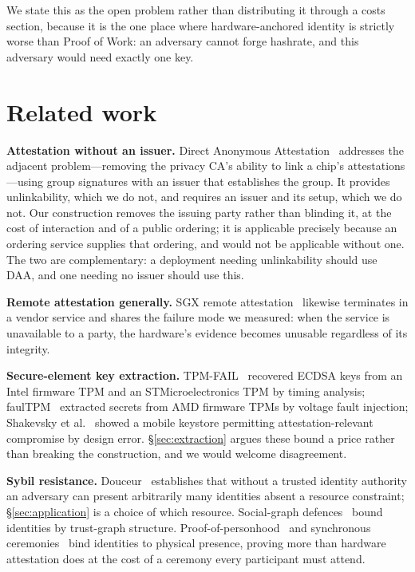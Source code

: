 \documentclass[conference,10pt]{IEEEtran}
\begin{document}
We state this as the open problem rather than distributing it through a costs section, because it is the
one place where hardware-anchored identity is strictly worse than Proof of Work: an adversary cannot
forge hashrate, and this adversary would need exactly one key.

\section{Related work}
\label{sec:related}

\textbf{Attestation without an issuer.} Direct Anonymous Attestation~\cite{daa} addresses the adjacent
problem---removing the privacy CA's ability to link a chip's attestations---using group signatures with
an issuer that establishes the group. It provides unlinkability, which we do not, and requires an issuer
and its setup, which we do not. Our construction removes the issuing party rather than blinding it, at
the cost of interaction and of a public ordering; it is applicable precisely because an ordering service
supplies that ordering, and would not be applicable without one. The two are complementary: a deployment
needing unlinkability should use DAA, and one needing no issuer should use this.

\textbf{Remote attestation generally.} SGX remote attestation~\cite{sgx} likewise terminates in a vendor
service and shares the failure mode we measured: when the service is unavailable to a party, the
hardware's evidence becomes unusable regardless of its integrity.

\textbf{Secure-element key extraction.} TPM-FAIL~\cite{tpmfail} recovered ECDSA keys from an Intel
firmware TPM and an STMicroelectronics TPM by timing analysis; faulTPM~\cite{faultpm} extracted secrets
from AMD firmware TPMs by voltage fault injection; Shakevsky et al.~\cite{trustzone} showed a mobile
keystore permitting attestation-relevant compromise by design error. \S\ref{sec:extraction} argues these
bound a price rather than breaking the construction, and we would welcome disagreement.

\textbf{Sybil resistance.} Douceur~\cite{douceur} establishes that without a trusted identity authority
an adversary can present arbitrarily many identities absent a resource constraint; \S\ref{sec:application}
is a choice of which resource. Social-graph defences~\cite{sybilguard} bound identities by trust-graph
structure. Proof-of-personhood~\cite{pop,offline-pseudonyms} and synchronous ceremonies~\cite{idena}
bind identities to physical presence, proving more than hardware attestation does at the cost of a
ceremony every participant must attend.
\end{document}

